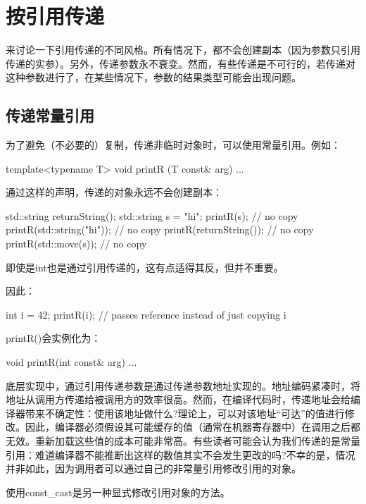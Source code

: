\section{按引用传递}

来讨论一下引用传递的不同风格。所有情况下，都不会创建副本（因为参数只引用传递的实参）。另外，传递参数永不衰变。然而，有些传递是不可行的，若传递对这种参数进行了，在某些情况下，参数的结果类型可能会出现问题。

\subsection{传递常量引用}

为了避免（不必要的）复制，传递非临时对象时，可以使用常量引用。例如：

\begin{cpp}
template<typename T>
void printR (T const& arg) {
	...
}
\end{cpp}

通过这样的声明，传递的对象永远不会创建副本：

\begin{cpp}
std::string returnString();
std::string s = "hi";
printR(s); // no copy
printR(std::string("hi")); // no copy
printR(returnString()); // no copy
printR(std::move(s)); // no copy
\end{cpp}

即使是int也是通过引用传递的，这有点适得其反，但并不重要。

因此：

\begin{cpp}
int i = 42;
printR(i); // passes reference instead of just copying i
\end{cpp}

printR()会实例化为：

\begin{cpp}
void printR(int const& arg) {
	...
}
\end{cpp}

底层实现中，通过引用传递参数是通过传递参数地址实现的。地址编码紧凑时，将地址从调用方传递给被调用方的效率很高。然而，在编译代码时，传递地址会给编译器带来不确定性：使用该地址做什么?理论上，可以对该地址“可达”的值进行修改。因此，编译器必须假设其可能缓存的值（通常在机器寄存器中）在调用之后都无效。重新加载这些值的成本可能非常高。有些读者可能会认为我们传递的是常量引用：难道编译器不能推断出这样的数值其实不会发生更改的吗?不幸的是，情况并非如此，因为调用者可以通过自己的非常量引用修改引用的对象。

\begin{notice}
使用const\_cast是另一种显式修改引用对象的方法。
\end{notice}

